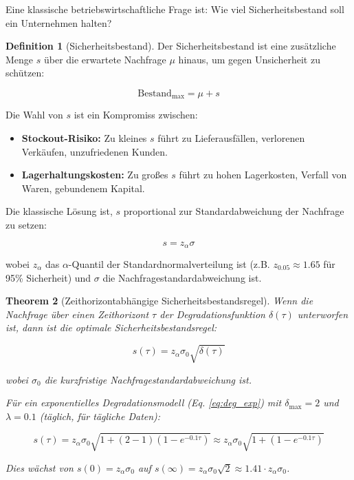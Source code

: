 \documentclass[a4paper, 12pt, twoside, openright]{report}
\newtheorem{theorem}{Theorem}[section]
\theoremstyle{definition}
\newtheorem{definition}[theorem]{Definition}
\theoremstyle{definition}
\begin{document}
Eine klassische betriebswirtschaftliche Frage ist: Wie viel Sicherheitsbestand soll ein Unternehmen halten?

\begin{definition}[Sicherheitsbestand]
Der Sicherheitsbestand ist eine zusätzliche Menge $s$ über die erwartete Nachfrage $\mu$ hinaus, um gegen Unsicherheit zu schützen:

\begin{equation}
\text{Bestand}_{\max} = \mu + s
\label{eq:safety_stock}
\end{equation}

Die Wahl von $s$ ist ein Kompromiss zwischen:
\begin{itemize}
  \item \textbf{Stockout-Risiko:} Zu kleines $s$ führt zu Lieferausfällen, verlorenen Verkäufen, unzufriedenen Kunden.
  \item \textbf{Lagerhaltungskosten:} Zu großes $s$ führt zu hohen Lagerkosten, Verfall von Waren, gebundenem Kapital.
\end{itemize}
\end{definition}

Die klassische Lösung ist, $s$ proportional zur Standardabweichung der Nachfrage zu setzen:

\begin{equation}
s = z_\alpha \sigma
\label{eq:classical_safety}
\end{equation}

wobei $z_\alpha$ das $\alpha$-Quantil der Standardnormalverteilung ist (z.B. $z_{0.05} \approx 1.65$ für 95\% Sicherheit) und $\sigma$ die Nachfragestandardabweichung ist.

\begin{theorem}[Zeithorizontabhängige Sicherheitsbestandsregel]
\label{thm:safety_stock_degradation}
Wenn die Nachfrage über einen Zeithorizont $\tau$ der Degradationsfunktion $\delta(\tau)$ unterworfen ist, dann ist die optimale Sicherheitsbestandsregel:

\begin{equation}
s(\tau) = z_\alpha \sigma_0 \sqrt{\delta(\tau)}
\label{eq:degradation_safety}
\end{equation}

wobei $\sigma_0$ die kurzfristige Nachfragestandardabweichung ist.

Für ein exponentielles Degradationsmodell (Eq. \ref{eq:deg_exp}) mit $\delta_{\max} = 2$ und $\lambda = 0.1$ (täglich, für tägliche Daten):

\begin{equation}
s(\tau) = z_\alpha \sigma_0 \sqrt{1 + (2-1)(1 - e^{-0.1\tau})} \approx z_\alpha \sigma_0 \sqrt{1 + (1-e^{-0.1\tau})}
\label{eq:safety_example}
\end{equation}

Dies wächst von $s(0) = z_\alpha \sigma_0$ auf $s(\infty) = z_\alpha \sigma_0 \sqrt{2} \approx 1.41 \cdot z_\alpha \sigma_0$.
\end{theorem}
\end{document}
